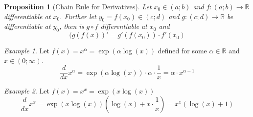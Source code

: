 \documentclass[english,titlepage]{uzhpub}
\theoremstyle{definition}
\theoremstyle{plain}
\newtheorem{proposition}[definition]{Proposition}
\theoremstyle{remark}
\theoremstyle{example}
\newtheorem*{example}{Example}
\begin{document}
   \begin{proposition}[Chain Rule for Derivatives]\label{pro:chain_rule}
      Let \(x_0 \in (a;b)\) and \(f: (a;b) \to \mathbb{R}\) differentiable at \(x_0\).
      Further let \(y_0 = f(x_0) \in (c;d)\) and \(g: (c;d) \to \mathbb{R}\) be differentiable at \(y_0\), then is \(g \circ f\) differentiable at \(x_0\) and
      \[(g(f(x))' = g'(f(x_0)) \cdot f'(x_0)\]
   \end{proposition}
   \begin{example}
      Let \(f(x) = x^\alpha = \exp(\alpha \log(x))\) defined for some \(\alpha \in \mathbb{R}\) and \(x \in (0;\infty)\).
      \[\frac{d}{dx}x^\alpha = \exp(\alpha \log(x)) \cdot \alpha \cdot \frac{1}{x} = \alpha \cdot x^{\alpha -1}\]
   \end{example}
   \begin{example}
      Let \(f(x) = x^x = \exp(x \log(x))\)
      \[\frac{d}{dx}x^x = \exp(x \log(x)) (\log(x) + x \cdot \frac{1}{x}) = x^x (\log(x) + 1)\]
   \end{example}
\end{document}
